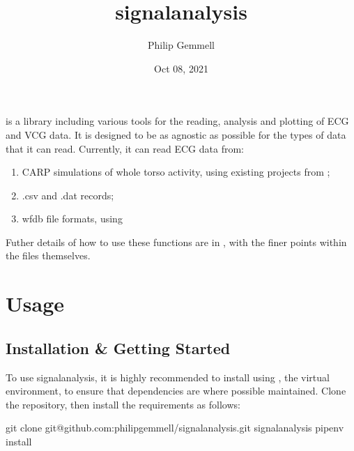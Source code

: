 \documentclass[letterpaper,10pt,english]{sphinxmanual}
\title{signalanalysis}
\date{Oct 08, 2021}
\author{Philip Gemmell}
\begin{document}
\pagestyle{empty}
\sphinxmaketitle
\pagestyle{plain}
\sphinxtableofcontents
\pagestyle{normal}
\label{\detokenize{index::doc}}


\sphinxAtStartPar
{} is a library including various tools for the reading, analysis and plotting of ECG and VCG data. It is designed to be as agnostic as possible for the types of data that it can read. Currently, it can read ECG data from:
\begin{enumerate}
%
\item {} 
\sphinxAtStartPar
CARP simulations of whole torso activity, using existing projects from ;

\item {} 
\sphinxAtStartPar
.csv and .dat records;

\item {} 
\sphinxAtStartPar
wfdb file formats, using 

\end{enumerate}

\sphinxAtStartPar
Futher details of how to use these functions are in {\hyperref[\detokenize{usage::doc}]{}}, with the finer points within the files themselves.


\chapter{Usage}
\label{\detokenize{usage:usage}}\label{\detokenize{usage::doc}}

\section{Installation \& Getting Started}
\label{\detokenize{usage:installation-getting-started}}\label{\detokenize{usage:installation}}
\sphinxAtStartPar
To use signalanalysis, it is highly recommended to install using , the virtual environment, to ensure that dependencies are where possible maintained. Clone the repository, then install the requirements as follows:

\begin{sphinxVerbatim}[commandchars=\\\{\}]
git clone git@github.com:philip\PYGZhy{}gemmell/signalanalysis.git
 signalanalysis
pipenv install
\end{sphinxVerbatim}
\end{document}
